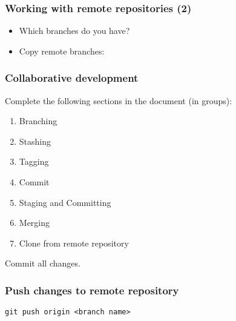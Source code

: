 \documentclass{beamer}
\begin{document}
\begin{frame}[t]
\frametitle{Working with remote repositories (2)}
\begin{itemize}
\item Which branches do you have?
\item<4-> Copy remote branches:
\end{itemize}
\end{frame}

\begin{frame}
\frametitle{Collaborative development}
Complete the following sections in the document (in groups):

\begin{enumerate}
\item Branching
\item Stashing
\item Tagging
\item Commit
\item Staging and Committing
\item Merging
\item Clone from remote repository
\end{enumerate}

Commit all changes.

\end{frame}

\begin{frame}[t]
\frametitle{Push changes to remote repository}
\begin{block}{}\tt git push origin <branch name>\end{block}
\end{frame}
\end{document}
